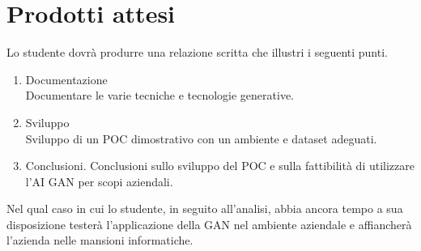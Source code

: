\section*{Prodotti attesi}
Lo studente dovrà produrre una relazione scritta che illustri i seguenti punti.
\begin{enumerate}
      \item Documentazione \\
            Documentare le varie tecniche e tecnologie generative.

      \item Sviluppo \\
            Sviluppo di un POC dimostrativo con un ambiente e dataset adeguati.

      \item Conclusioni.
            Conclusioni sullo sviluppo del POC e sulla fattibilità di
            utilizzare l'AI GAN per scopi aziendali.
\end{enumerate}

Nel qual caso in cui lo studente, in seguito all'analisi, abbia ancora tempo a sua disposizione testerà l'applicazione della GAN nel ambiente aziendale e affiancherà l'azienda nelle mansioni informatiche.
